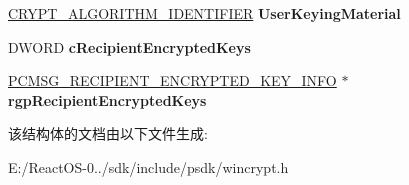 \begin{DoxyCompactItemize}
\begin{tabbing}
\end{tabbing}\item 
\mbox{\label{struct___c_m_s_g___k_e_y___a_g_r_e_e___r_e_c_i_p_i_e_n_t___i_n_f_o_ae3bca6b1d4754389dc2177177c3a7a47}} 
\hyperlink{struct___c_r_y_p_t___a_l_g_o_r_i_t_h_m___i_d_e_n_t_i_f_i_e_r}{C\+R\+Y\+P\+T\+\_\+\+A\+L\+G\+O\+R\+I\+T\+H\+M\+\_\+\+I\+D\+E\+N\+T\+I\+F\+I\+ER} {\bfseries User\+Keying\+Material}
\item 
\mbox{\label{struct___c_m_s_g___k_e_y___a_g_r_e_e___r_e_c_i_p_i_e_n_t___i_n_f_o_a6bc4247c2b7f9afbfb8fa5685da0799d}} 
D\+W\+O\+RD {\bfseries c\+Recipient\+Encrypted\+Keys}
\item 
\mbox{\label{struct___c_m_s_g___k_e_y___a_g_r_e_e___r_e_c_i_p_i_e_n_t___i_n_f_o_acfec4578b9fa3754412d5273d1552708}} 
\hyperlink{struct___c_m_s_g___r_e_c_i_p_i_e_n_t___e_n_c_r_y_p_t_e_d___k_e_y___i_n_f_o}{P\+C\+M\+S\+G\+\_\+\+R\+E\+C\+I\+P\+I\+E\+N\+T\+\_\+\+E\+N\+C\+R\+Y\+P\+T\+E\+D\+\_\+\+K\+E\+Y\+\_\+\+I\+N\+FO} $\ast$ {\bfseries rgp\+Recipient\+Encrypted\+Keys}
\end{DoxyCompactItemize}


该结构体的文档由以下文件生成\+:\begin{DoxyCompactItemize}
\item 
E\+:/\+React\+O\+S-\/0../sdk/include/psdk/wincrypt.\+h\end{DoxyCompactItemize}
